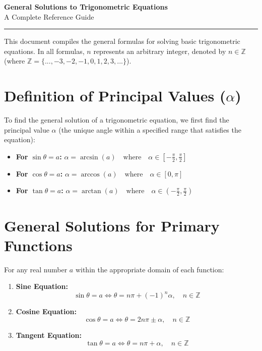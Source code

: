 \documentclass[11pt, a4paper]{article}
\begin{document}
\begin{center}
    {\LARGE \textbf{General Solutions to Trigonometric Equations}} \\[0.3cm]
    {\large A Complete Reference Guide} \\[0.2cm]
    \rule{\textwidth}{0.8pt}
\end{center}

\vspace{0.5cm}

This document compiles the general formulas for solving basic trigonometric equations. In all formulas, $n$ represents an arbitrary integer, denoted by $n \in \mathbb{Z}$ (where $\mathbb{Z} = \{..., -3, -2, -1, 0, 1, 2, 3, ...\}$).

\section{Definition of Principal Values ($\alpha$)}
To find the general solution of a trigonometric equation, we first find the principal value $\alpha$ (the unique angle within a specified range that satisfies the equation):

\begin{itemize}
    \item \textbf{For $\sin\theta = a$:} $\alpha = \arcsin(a) \quad \text{where} \quad \alpha \in \left[-\frac{\pi}{2}, \frac{\pi}{2}\right]$
    \item \textbf{For $\cos\theta = a$:} $\alpha = \arccos(a) \quad \text{where} \quad \alpha \in [0, \pi]$
    \item \textbf{For $\tan\theta = a$:} $\alpha = \arctan(a) \quad \text{where} \quad \alpha \in \left(-\frac{\pi}{2}, \frac{\pi}{2}\right)$
\end{itemize}

\section{General Solutions for Primary Functions}
For any real number $a$ within the appropriate domain of each function:

\begin{enumerate}
    \item \textbf{Sine Equation:}
    $$\sin\theta = a \iff \theta = n\pi + (-1)^n \alpha, \quad n \in \mathbb{Z}$$
    
    \item \textbf{Cosine Equation:}
    $$\cos\theta = a \iff \theta = 2n\pi \pm \alpha, \quad n \in \mathbb{Z}$$
    
    \item \textbf{Tangent Equation:}
    $$\tan\theta = a \iff \theta = n\pi + \alpha, \quad n \in \mathbb{Z}$$
\end{enumerate}
\end{document}
